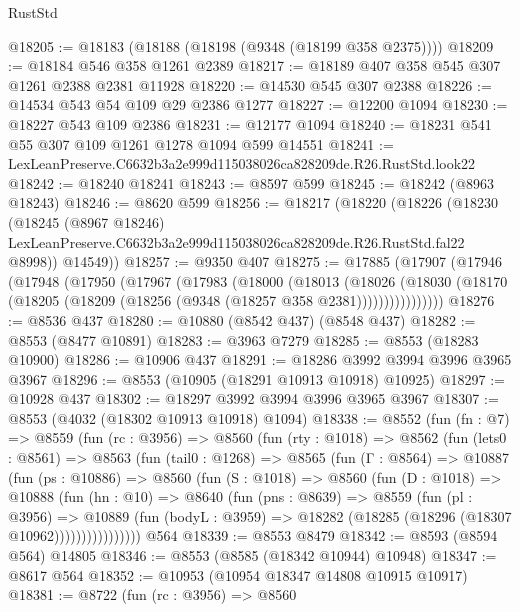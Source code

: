 \begin{lexlean}{RustStd}
\begin{coremodule}
@18205 := @18183 (@18188 (@18198 (@9348 (@18199 @358 @2375))))
@18209 := @18184 @546 @358 @1261 @2389
@18217 := @18189 @407 @358 @545 @307 @1261 @2388 @2381 @11928
@18220 := @14530 @545 @307 @2388
@18226 := @14534 @543 @54 @109 @29 @2386 @1277
@18227 := @12200 @1094
@18230 := @18227 @543 @109 @2386
@18231 := @12177 @1094
@18240 := @18231 @541 @55 @307 @109 @1261 @1278 @1094 @599 @14551
@18241 := LexLeanPreserve.C6632b3a2e999d115038026ca828209de.R26.RustStd.look22
@18242 := @18240 @18241
@18243 := @8597 @599
@18245 := @18242 (@8963 @18243)
@18246 := @8620 @599
@18256 := @18217
    (@18220
      (@18226
        (@18230
          (@18245
            (@8967 @18246)
            LexLeanPreserve.C6632b3a2e999d115038026ca828209de.R26.RustStd.fal22
            @8998))
        @14549))
@18257 := @9350 @407
@18275 := @17885
    (@17907
      (@17946
        (@17948
          (@17950
            (@17967
              (@17983
                (@18000
                  (@18013
                    (@18026
                      (@18030
                        (@18170 (@18205 (@18209 (@18256 (@9348 (@18257 @358 @2381))))))))))))))))
@18276 := @8536 @437
@18280 := @10880 (@8542 @437) (@8548 @437)
@18282 := @8553 (@8477 @10891)
@18283 := @3963 @7279
@18285 := @8553 (@18283 @10900)
@18286 := @10906 @437
@18291 := @18286 @3992 @3994 @3996 @3965 @3967
@18296 := @8553 (@10905 (@18291 @10913 @10918) @10925)
@18297 := @10928 @437
@18302 := @18297 @3992 @3994 @3996 @3965 @3967
@18307 := @8553 (@4032 (@18302 @10913 @10918) @1094)
@18338 := @8552
    (fun (fn : @7) =>
    @8559
      (fun (rc : @3956) =>
      @8560
        (fun (rty : @1018) =>
        @8562
          (fun (lets0 : @8561) =>
          @8563
            (fun (tail0 : @1268) =>
            @8565
              (fun (Γ : @8564) =>
              @10887
                (fun (ps : @10886) =>
                @8560
                  (fun (S : @1018) =>
                  @8560
                    (fun (D : @1018) =>
                    @10888
                      (fun (hn : @10) =>
                      @8640
                        (fun (pns : @8639) =>
                        @8559
                          (fun (pl : @3956) =>
                          @10889
                            (fun (bodyL : @3959) =>
                            @18282 (@18285 (@18296 (@18307 @10962))))))))))))))))
    @564
@18339 := @8553 @8479
@18342 := @8593 (@8594 @564) @14805
@18346 := @8553 (@8585 (@18342 @10944) @10948)
@18347 := @8617 @564
@18352 := @10953 (@10954 @18347 @14808 @10915 @10917)
@18381 := @8722
    (fun (rc : @3956) =>
    @8560

\end{coremodule}
\end{lexlean}
